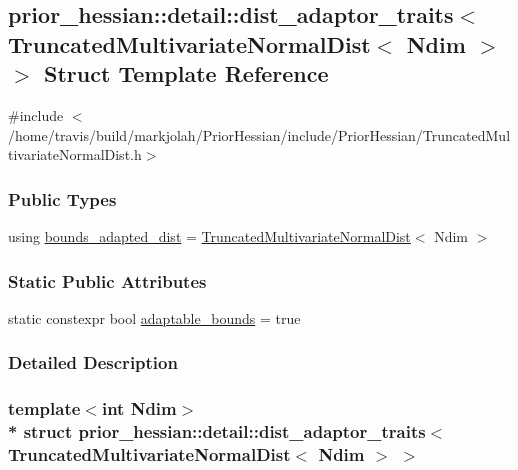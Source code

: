 \hypertarget{structprior__hessian_1_1detail_1_1dist__adaptor__traits_3_01TruncatedMultivariateNormalDist_3_01Ndim_01_4_01_4}{}\subsection{prior\+\_\+hessian\+:\+:detail\+:\+:dist\+\_\+adaptor\+\_\+traits$<$ Truncated\+Multivariate\+Normal\+Dist$<$ Ndim $>$ $>$ Struct Template Reference}
\label{structprior__hessian_1_1detail_1_1dist__adaptor__traits_3_01TruncatedMultivariateNormalDist_3_01Ndim_01_4_01_4}


{\ttfamily \#include $<$/home/travis/build/markjolah/\+Prior\+Hessian/include/\+Prior\+Hessian/\+Truncated\+Multivariate\+Normal\+Dist.\+h$>$}

\subsubsection*{Public Types}
\begin{DoxyCompactItemize}
\item 
using \hyperlink{structprior__hessian_1_1detail_1_1dist__adaptor__traits_3_01TruncatedMultivariateNormalDist_3_01Ndim_01_4_01_4_a43e134989627146928378cf267b991b4}{bounds\+\_\+adapted\+\_\+dist} = \hyperlink{namespaceprior__hessian_a99ef03c8a3e476931d451d6d944ffae5}{Truncated\+Multivariate\+Normal\+Dist}$<$ Ndim $>$
\end{DoxyCompactItemize}
\subsubsection*{Static Public Attributes}
\begin{DoxyCompactItemize}
\item 
static constexpr bool \hyperlink{structprior__hessian_1_1detail_1_1dist__adaptor__traits_3_01TruncatedMultivariateNormalDist_3_01Ndim_01_4_01_4_a5a7a73e24a925a4e7696ff7259f855c5}{adaptable\+\_\+bounds} = true
\end{DoxyCompactItemize}


\subsubsection{Detailed Description}
\subsubsection*{template$<$int Ndim$>$\\*
struct prior\+\_\+hessian\+::detail\+::dist\+\_\+adaptor\+\_\+traits$<$ Truncated\+Multivariate\+Normal\+Dist$<$ Ndim $>$ $>$}




